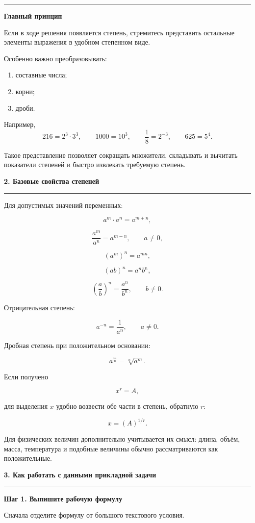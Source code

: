 \documentclass[a4paper,12pt]{article}
\newcommand{\topic}[1]{%
  \vspace{0.5em}
  {\Large\bfseries\color{darkaccent}#1}\par
  \vspace{0.25em}
  {\color{accent}\rule{\linewidth}{0.7pt}}\par
  \vspace{0.6em}
}
\newcommand{\subtopic}[1]{%
  \vspace{0.5em}
  {\large\bfseries\color{darkaccent}#1}\par
  \vspace{0.25em}
}
\newcommand{\keyidea}[1]{%
  \par\medskip
  {\color{accent}\rule{8mm}{1.2pt}}\quad
  \textbf{#1}
  \par\smallskip
}
\begin{document}
\keyidea{Главный принцип}

Если в ходе решения появляется степень, стремитесь представить
остальные элементы выражения в удобном степенном виде.

Особенно важно преобразовывать:

\begin{enumerate}
  \item составные числа;
  \item корни;
  \item дроби.
\end{enumerate}

Например,
\[
216=2^3\cdot3^3,
\qquad
1000=10^3,
\qquad
\frac18=2^{-3},
\qquad
625=5^4.
\]

Такое представление позволяет сокращать множители, складывать и
вычитать показатели степеней и быстро извлекать требуемую степень.

\topic{2. Базовые свойства степеней}

Для допустимых значений переменных:

\[
a^m\cdot a^n=a^{m+n},
\]

\[
\frac{a^m}{a^n}=a^{m-n},
\qquad a\ne0,
\]

\[
\left(a^m\right)^n=a^{mn},
\]

\[
(ab)^n=a^n b^n,
\]

\[
\left(\frac ab\right)^n=\frac{a^n}{b^n},
\qquad b\ne0.
\]

Отрицательная степень:

\[
a^{-n}=\frac1{a^n},
\qquad a\ne0.
\]

Дробная степень при положительном основании:

\[
a^{\frac mn}
=
\sqrt[n]{a^m}.
\]

Если получено

\[
x^r=A,
\]

для выделения \(x\) удобно возвести обе части в степень,
обратную \(r\):

\[
x=\left(A\right)^{1/r}.
\]

Для физических величин дополнительно учитывается их смысл:
длина, объём, масса, температура и подобные величины обычно
рассматриваются как положительные.

\topic{3. Как работать с данными прикладной задачи}

\subtopic{Шаг 1. Выпишите рабочую формулу}

Сначала отделите формулу от большого текстового условия.
\end{document}
